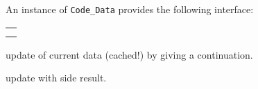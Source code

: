 \begin{isabellebody}
\begin{isamarkuptext}
  \noindent An instance of \verb|Code_Data| provides the following
  interface:

  \medskip
  \begin{tabular}{l}
  \isa{change{\isacharcolon}\ theory\ {\isasymrightarrow}\ {\isacharparenleft}T\ {\isasymrightarrow}\ T{\isacharparenright}\ {\isasymrightarrow}\ T} \\
  \isa{change{\isacharunderscore}yield{\isacharcolon}\ theory\ {\isasymrightarrow}\ {\isacharparenleft}T\ {\isasymrightarrow}\ {\isacharprime}a\ {\isacharasterisk}\ T{\isacharparenright}\ {\isasymrightarrow}\ {\isacharprime}a\ {\isacharasterisk}\ T}
  \end{tabular}

  \begin{description}

  \item {} update of current data (cached!)
    by giving a continuation.

  \item {} update with side result.

  \end{description}%
\end{isamarkuptext}%
\isamarkuptrue%
%
\isadelimtheory
%
\endisadelimtheory
%
\isatagtheory
{}\isamarkupfalse%
%
\endisatagtheory
{\isafoldtheory}%
%
\isadelimtheory
%
\endisadelimtheory
\isanewline
\end{isabellebody}%
